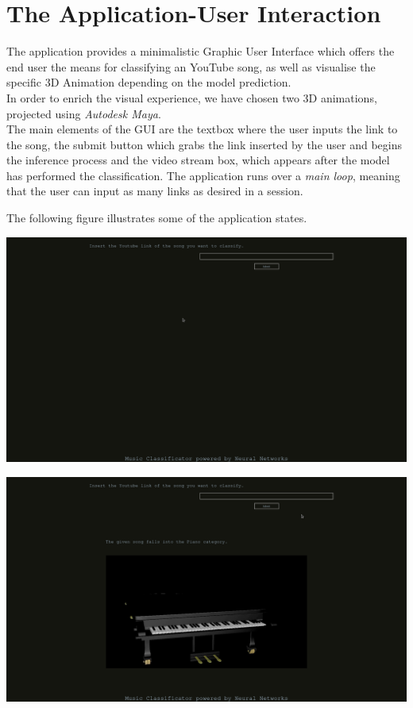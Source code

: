 \section{The Application-User Interaction}
	The application provides a minimalistic Graphic User Interface which offers the end user the means for
	classifying an YouTube song, as well as visualise the specific 3D Animation depending on the model prediction. \\
	In order to enrich the visual experience, we have chosen two 3D animations, projected using \textit{Autodesk Maya}.\\
	The main elements of the GUI are the textbox where the user inputs the link to the song, the submit
	button which grabs the link inserted by the user and begins the inference process and the video stream box,
	which appears after the model has performed the classification. The application runs over a \textit{main loop},
	meaning that the user can input as many links as desired in a session.


	The following figure illustrates some of the application states.


			\begin{center}
				\centering
				\includegraphics[width = 5.5in]{images/basic_interface.png}
				\centerline{}
			\label{guis}
			\end{center}

			\begin{center}
				\centering
				\includegraphics[width = 5.5in]{images/piano.png}
			\centerline{}
			\label{guip}
			\end{center}

